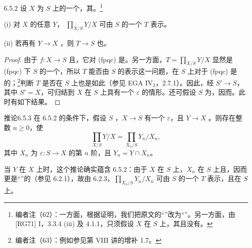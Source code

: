 \begin{SGAresult}{}{6.5.2}
设 $X$ 为 $S$ 上的一个，其。\footnote{编者注（62）：一方面，根据证明，我们把原文的“”改为“”。另一方面，由 [RG71] I，3.3.4 (iii) 及 4.1.1，只须假设 $X$ 在 $S$ 上，其且没有。}

(i) 对 $X$ 的任意 $Y$， $\prod_{X/S}Y/X$ 可由 $S$ 的一个 $T$ 表示。

(ii) 若再有 $Y\to X$ ，则 $T\to S$ 也。
\end{SGAresult}
\begin{proof}
由于 $f:X\to S$ 且，它对 (fpqc) 是。另一方面，$T=\prod_{X/S}Y/X$ 显然是 (fpqc) 下 $S$ 的一个，所以 $T$ 能否由 $S$ 的表示这一问题，在 $S$ 上对于 (fpqc) 是的；\footnote{编者注（63）：例如参见第 VIII 讲的增补 1.7。}判断 $T$ 是否在 $S$ 上也是如此（参见 EGA $\mathrm{IV}_2$，2.7.1）。因此，经 $S'\to S$，其中 $S'=X$，可归结到 $X$ 在 $S$ 上具有一个 $\varepsilon$ 的情形。还可假设 $S$ 为，因而。此时有如下结果。
\end{proof}

\begin{SGAresult}{推论}{6.5.3}
在 6.5.2 的条件下，假设 $S$ ，$X\to S$ 有一个 $\varepsilon$，且 $Y\to X$ 。则存在整数 $n\geq0$，使
\[
\prod_{X/S}Y/X=\prod_{X_n/S}Y_n/X_n,
\]
其中 $X_n$ 为 $\varepsilon:S\to X$ 的第 $n$ 阶，且 $Y_n=Y\cap X_n$。
\end{SGAresult}
当 $Y$ 在 $X$ 上时，这个推论确实蕴含 6.5.2：由于 $X$ 在 $S$ 上，$X_n$ 在 $S$ 上且，因而更是“”的（参见 6.2.1），故由 6.2.3，$\prod_{X_n/S}Y_n/X_n$ 可由 $S$ 的一个 $T$ 表示，且在 $S$ 上。

